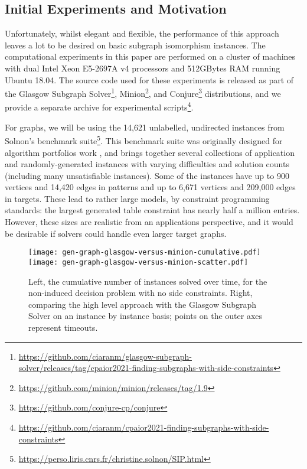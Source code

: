 \documentclass[runningheads]{llncs}
\begin{document}
\subsection{Initial Experiments and Motivation}

Unfortunately, whilst elegant and flexible, the performance of this approach leaves a lot to be
desired on basic subgraph isomorphism instances.  The computational experiments in this paper are
performed on a cluster of machines with dual Intel Xeon E5-2697A v4 processors and 512GBytes RAM
running Ubuntu 18.04. The source code used for these experiments is released as part of the Glasgow
Subgraph
Solver\footnote{\url{https://github.com/ciaranm/glasgow-subgraph-solver/releases/tag/cpaior2021-finding-subgraphs-with-side-constraints}},
Minion\footnote{\url{https://github.com/minion/minion/releases/tag/1.9}}, and
Conjure\footnote{\url{https://github.com/conjure-cp/conjure}} distributions, and we provide a
separate archive for experimental
scripts\footnote{\url{https://github.com/ciaranm/cpaior2021-finding-subgraphs-with-side-constraints}}.

For graphs, we will be using the 14,621 unlabelled, undirected instances from
Solnon's benchmark suite\footnote{\url{https://perso.liris.cnrs.fr/christine.solnon/SIP.html}}. This
benchmark suite was originally designed for algorithm portfolios work
\cite{DBLP:conf/lion/KotthoffMS16}, and brings together several collections of application and
randomly-generated instances with varying difficulties and solution counts (including many
unsatisfiable instances). Some of the instances have up to 900 vertices and 14,420 edges in patterns
and up to 6,671 vertices and 209,000 edges in targets. These lead to rather large models, by
constraint programming standards: the largest generated table constraint has nearly half a million
entries. However, these sizes are realistic from an applications perspective, and it would be
desirable if solvers could handle even larger target graphs.

\begin{figure}[tb]
\texttt{[image: gen-graph-glasgow-versus-minion-cumulative.pdf]}\hfill\texttt{[image: gen-graph-glasgow-versus-minion-scatter.pdf]}

    \caption{Left, the cumulative number of instances solved over time, for the non-induced decision
    problem with no side constraints. Right, comparing the high level approach with the Glasgow
    Subgraph Solver on an instance by instance basis; points on the outer axes represent
    timeouts.}\label{figure:solvers}
\end{figure}
\end{document}
